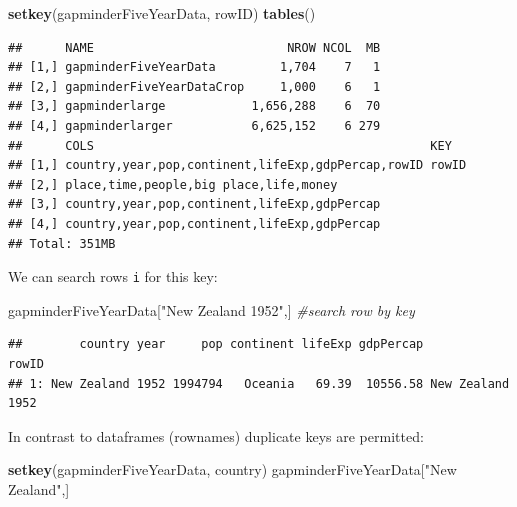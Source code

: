 \documentclass[]{article}
\newenvironment{Shaded}{\begin{snugshade}}{\end{snugshade}}
\newcommand{\KeywordTok}[1]{\textcolor[rgb]{0.13,0.29,0.53}{\textbf{{#1}}}}
\newcommand{\StringTok}[1]{\textcolor[rgb]{0.31,0.60,0.02}{{#1}}}
\newcommand{\CommentTok}[1]{\textcolor[rgb]{0.56,0.35,0.01}{\textit{{#1}}}}
\newcommand{\NormalTok}[1]{{#1}}
\begin{document}
\begin{Shaded}
\begin{Highlighting}[]
\KeywordTok{setkey}\NormalTok{(gapminderFiveYearData, rowID)}
\KeywordTok{tables}\NormalTok{()}
\end{Highlighting}
\end{Shaded}

\begin{verbatim}
##      NAME                           NROW NCOL  MB
## [1,] gapminderFiveYearData         1,704    7   1
## [2,] gapminderFiveYearDataCrop     1,000    6   1
## [3,] gapminderlarge            1,656,288    6  70
## [4,] gapminderlarger           6,625,152    6 279
##      COLS                                               KEY  
## [1,] country,year,pop,continent,lifeExp,gdpPercap,rowID rowID
## [2,] place,time,people,big place,life,money                  
## [3,] country,year,pop,continent,lifeExp,gdpPercap            
## [4,] country,year,pop,continent,lifeExp,gdpPercap            
## Total: 351MB
\end{verbatim}

We can search rows \texttt{i} for this key:

\begin{Shaded}
\begin{Highlighting}[]
\NormalTok{gapminderFiveYearData[}\StringTok{"New Zealand 1952"}\NormalTok{,] }\CommentTok{#search row by key}
\end{Highlighting}
\end{Shaded}

\begin{verbatim}
##        country year     pop continent lifeExp gdpPercap            rowID
## 1: New Zealand 1952 1994794   Oceania   69.39  10556.58 New Zealand 1952
\end{verbatim}

In contrast to dataframes (rownames) duplicate keys are permitted:

\begin{Shaded}
\begin{Highlighting}[]
\KeywordTok{setkey}\NormalTok{(gapminderFiveYearData, country)}
\NormalTok{gapminderFiveYearData[}\StringTok{"New Zealand"}\NormalTok{,]}
\end{Highlighting}
\end{Shaded}
\end{document}
